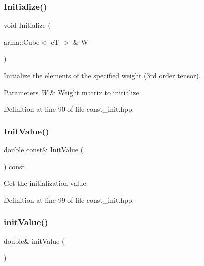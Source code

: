 \subsubsection{Initialize()\hspace{0.1cm}{\footnotesize\ttfamily [4/4]}}
{\footnotesize\ttfamily void Initialize (\begin{DoxyParamCaption}\item[{arma\+::\+Cube$<$ eT $>$ \&}]{W }\end{DoxyParamCaption})\hspace{0.3cm}{\ttfamily [inline]}}



Initialize the elements of the specified weight (3rd order tensor). 


\begin{DoxyParams}{Parameters}
{\em W} & Weight matrix to initialize. \\
\hline
\end{DoxyParams}


Definition at line 90 of file const\+\_\+init.\+hpp.

\mbox{\label{classmlpack_1_1ann_1_1ConstInitialization_a5d3c69bca294328f8ee408de931ba6de}} 
\subsubsection{Init\+Value()}
{\footnotesize\ttfamily double const\& Init\+Value (\begin{DoxyParamCaption}{ }\end{DoxyParamCaption}) const\hspace{0.3cm}{\ttfamily [inline]}}



Get the initialization value. 



Definition at line 99 of file const\+\_\+init.\+hpp.

\mbox{\label{classmlpack_1_1ann_1_1ConstInitialization_a49a1b2ccd67469246ceaabc154c836d5}} 
\subsubsection{init\+Value()}
{\footnotesize\ttfamily double\& init\+Value (\begin{DoxyParamCaption}{ }\end{DoxyParamCaption})\hspace{0.3cm}{\ttfamily [inline]}}



